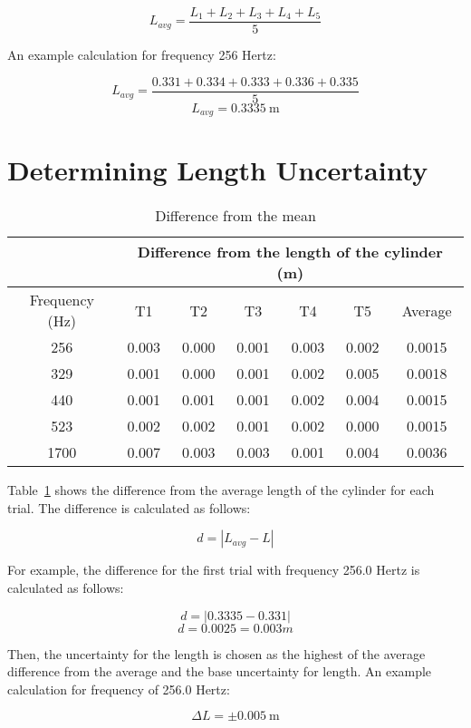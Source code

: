 \documentclass{report}
\begin{document}
\[L_{avg}=\frac{L_1+L_2+L_3+L_4+L_5}{5}\]

An example calculation for frequency 256 Hertz:

\[L_{avg}=\frac{0.331+0.334+0.333+0.336+0.335}{5}\]
\[L_{avg}=\SI{0.3335}{\metre}\]

\section{Determining Length Uncertainty}

\begin{table}[H]
  \centering
  \begin{tabular}{@{}ccccccc@{}}
    \toprule
    & \multicolumn{6}{c}{Difference from the length of the cylinder
    (m)} \\ \midrule
    Frequency (Hz) & T1        & T2       & T3       & T4       & T5
    & Average    \\
    256            & 0.003     & 0.000    & 0.001    & 0.003    &
    0.002    & 0.0015     \\
    329            & 0.001     & 0.000    & 0.001    & 0.002    &
    0.005    & 0.0018     \\
    440            & 0.001     & 0.001    & 0.001    & 0.002    &
    0.004    & 0.0015     \\
    523            & 0.002     & 0.002    & 0.001    & 0.002    &
    0.000    & 0.0015     \\
    1700           & 0.007     & 0.003    & 0.003    & 0.001    &
    0.004    & 0.0036     \\ \bottomrule
  \end{tabular}
  \caption{Difference from the mean}\label{tab:diff-from-mean}
\end{table}

Table~\ref{tab:diff-from-mean} shows the difference from the average
length of the cylinder
for each trial. The difference is calculated as follows:

\[d=|L_{avg}-L|\]

For example, the difference for the first trial with frequency 256.0
Hertz is calculated as follows:

\[d=|0.3335-0.331|\]
\[d=0.0025=0.003 m\]

Then, the uncertainty for the length is chosen as the highest of the
average difference from the average and the base uncertainty for
length. An example calculation for frequency of 256.0 Hertz:

\[\Delta L=\pm\SI{0.005}{\metre}\]
\end{document}
